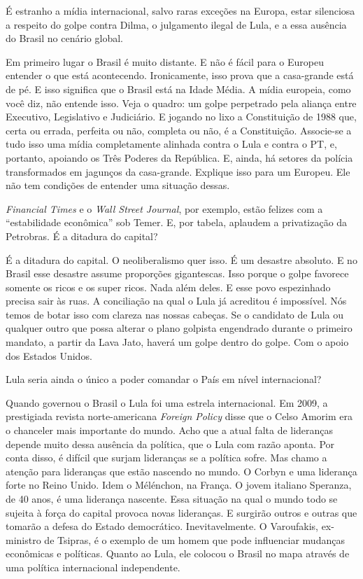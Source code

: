 \falaG É estranho a mídia internacional, salvo raras exceções na Europa,
estar silenciosa a respeito do golpe contra Dilma, o julgamento ilegal
de Lula, e a essa ausência do Brasil no cenário global.

\falaM Em primeiro lugar o Brasil é muito distante. E não é fácil para o
Europeu entender o que está acontecendo. Ironicamente, isso prova que a
casa-grande está de pé. E isso significa que o Brasil está na Idade
Média. A mídia europeia, como você diz, não entende isso. Veja o quadro:
um golpe perpetrado pela aliança entre Executivo, Legislativo e
Judiciário. E jogando no lixo a Constituição de 1988 que, certa ou
errada, perfeita ou não, completa ou não, é a Constituição. Associe-se a
tudo isso uma mídia completamente alinhada contra o Lula e contra o PT,
e, portanto, apoiando os Três Poderes da República. E, ainda, há setores
da polícia transformados em jagunços da casa-grande. Explique isso para
um Europeu. Ele não tem condições de entender uma situação dessas.

\falaG \emph{Financial Times} e o \emph{Wall Street Journal}, por exemplo,
estão felizes com a ``estabilidade econômica'' sob Temer. E, por tabela,
aplaudem a privatização da Petrobras. É a ditadura do capital?

\falaM É a ditadura do capital. O neoliberalismo quer isso. É um desastre
absoluto. E no Brasil esse desastre assume proporções gigantescas. Isso
porque o golpe favorece somente os ricos e os super ricos. Nada além
deles. E esse povo espezinhado precisa sair às ruas. A conciliação na
qual o Lula já acreditou é impossível. Nós temos de botar isso com
clareza nas nossas cabeças. Se o candidato de Lula ou qualquer outro que
possa alterar o plano golpista engendrado durante o primeiro mandato, a
partir da Lava Jato, haverá um golpe dentro do golpe. Com o apoio dos
Estados Unidos.

\falaG Lula seria ainda o único a poder comandar o País em nível
internacional?

\falaM Quando governou o Brasil o Lula foi uma estrela internacional. Em
2009, a prestigiada revista norte-americana \emph{Foreign Policy} disse
que o Celso Amorim era o chanceler mais importante do mundo. Acho que a
atual falta de lideranças depende muito dessa ausência da política, que
o Lula com razão aponta. Por conta disso, é difícil que surjam
lideranças se a política sofre. Mas chamo a atenção para lideranças que
estão nascendo no mundo. O Corbyn e uma liderança forte no Reino Unido.
Idem o Mélénchon, na França. O jovem italiano Speranza, de 40 anos, é
uma liderança nascente. Essa situação na qual o mundo todo se sujeita à
força do capital provoca novas lideranças. E surgirão outros e outras
que tomarão a defesa do Estado democrático. Inevitavelmente. O
Varoufakis, ex-ministro de Tsipras, é o exemplo de um homem que pode
influenciar mudanças econômicas e políticas. Quanto ao Lula, ele colocou
o Brasil no mapa através de uma política internacional independente.

